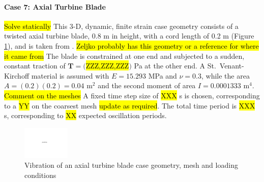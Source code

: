 \documentclass[sn-mathphys,Numbered]{sn-jnl}%
\newcommand{\bb}{\boldsymbol}
\begin{document}
\paragraph{Case 7: Axial Turbine Blade}
\hl{Solve statically}
This 3-D, dynamic, finite strain case geometry consists of a twisted axial turbine blade, 0.8 m in height, with a cord length of 0.2 m (Figure \ref{fig:turbine_blade}), and is taken from \citet{Tukovic2007}.
\hl{Zeljko probably has this geometry or a reference for where it came from}
The blade is constrained at one end and subjected to a sudden, constant traction of $\bb{T} = ($\hl{ZZZ,ZZZ,ZZZ}$)$ Pa at the other end.
A St.\ Venant-Kirchoff material is assumed with $E = 15.293$ MPa and $\nu = 0.3$, while the area $A = (0.2)(0.2) = 0.04$ m$^2$ and the second moment of area $I = 0.0001333$ m$^4$.
\hl{Comment on the meshes}
A fixed time step size of \hl{XXX} s is chosen, corresponding to a \hl{YY} on the coarsest mesh \hl{update as required}.
The total time period is \hl{XXX} s, corresponding to \hl{XX} expected oscillation periods.
\begin{figure}[htbp]
   \centering
   \includegraphics[width=0.2\textwidth]{figures/placeholder.pdf} 
   \caption{Vibration of an axial turbine blade case geometry, mesh and loading conditions}
   \label{fig:turbine_blade}
\end{figure}
\end{document}
